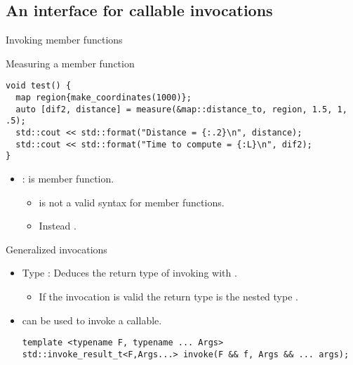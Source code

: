 \subsection{An interface for callable invocations}

\begin{frame}[t,fragile]{Invoking member functions}
\begin{block}{Measuring a member function}
\begin{lstlisting}[escapechar=@]
void test() {
  map region{make_coordinates(1000)};                              
  auto [dif2, distance] = measure(&map::distance_to, region, 1.5, 1, .5);  
  std::cout << std::format("Distance = {:.2}\n", distance);
  std::cout << std::format("Time to compute = {:L}\n", dif2);
}
\end{lstlisting}
\end{block}
\begin{itemize}
  \item {}:  is member function.
    \begin{itemize}
      \item {} is not a valid syntax for member functions.
      \item Instead .
    \end{itemize}
\end{itemize}
\end{frame}

\begin{frame}[t,fragile]{Generalized invocations}
\begin{itemize}
  \item Type : 
        Deduces the return type of invoking  with .
    \begin{itemize}
      \item If the invocation is valid the return type is the
            nested type .
    \end{itemize}

  \item {} can be used to invoke a callable.
\begin{lstlisting}
template <typename F, typename ... Args>
std::invoke_result_t<F,Args...> invoke(F && f, Args && ... args);
\end{lstlisting}
\end{itemize}
\end{frame}

